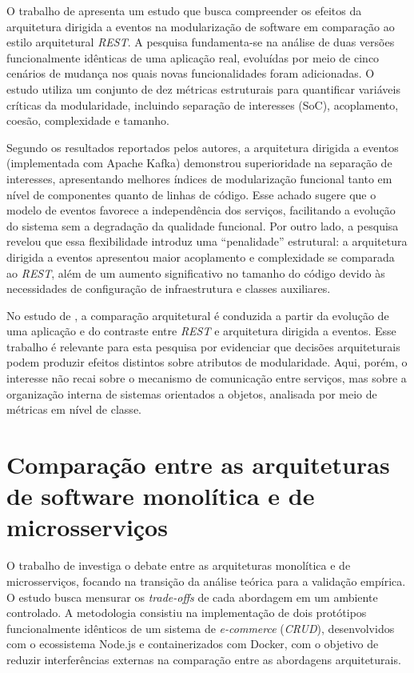 O trabalho de  apresenta um estudo que busca compreender os efeitos da arquitetura dirigida 
a eventos na modularização de software em comparação ao estilo arquitetural \textit{REST}. A pesquisa fundamenta-se na análise de duas versões 
funcionalmente idênticas de uma aplicação real, evoluídas por meio de cinco cenários de mudança nos quais novas funcionalidades foram 
adicionadas. O estudo utiliza um conjunto de dez métricas estruturais para quantificar variáveis críticas da modularidade, 
incluindo separação de interesses (SoC), acoplamento, coesão, complexidade e tamanho.

Segundo os resultados reportados pelos autores, a arquitetura dirigida a eventos (implementada com Apache Kafka) demonstrou 
superioridade na separação de interesses, apresentando melhores índices de modularização funcional tanto em nível de componentes 
quanto de linhas de código. Esse achado sugere que o modelo de eventos favorece a independência dos serviços, facilitando a evolução
do sistema sem a degradação da qualidade funcional. Por outro lado, a pesquisa revelou que essa flexibilidade introduz uma ``penalidade'' 
estrutural: a arquitetura dirigida a eventos apresentou maior acoplamento e complexidade se comparada ao \textit{REST}, além de um aumento 
significativo no tamanho do código devido às necessidades de configuração de infraestrutura e classes auxiliares.

No estudo de , a comparação arquitetural é conduzida a partir da evolução de uma aplicação e 
do contraste entre \textit{REST} e arquitetura dirigida a eventos. Esse trabalho é relevante para esta pesquisa por evidenciar 
que decisões arquiteturais podem produzir efeitos distintos sobre atributos de modularidade. Aqui, porém, o interesse 
não recai sobre o mecanismo de comunicação entre serviços, mas sobre a organização interna de sistemas orientados a 
objetos, analisada por meio de métricas em nível de classe.

\section{Comparação entre as arquiteturas de software monolítica e de microsserviços}
\label{sec:comparacao-entre-as-arquiteturas-de-software-monolitica-e-de-microsservicos}

O trabalho de  investiga o debate entre as arquiteturas monolítica e de microsserviços, focando na transição da 
análise teórica para a validação empírica. O estudo busca mensurar os \textit{trade-offs} de cada abordagem em um ambiente controlado. 
A metodologia consistiu na implementação de dois protótipos funcionalmente idênticos de um sistema de \textit{e-commerce} (\textit{CRUD}), 
desenvolvidos com o ecossistema Node.js e containerizados com Docker, com o objetivo de reduzir interferências externas na 
comparação entre as abordagens arquiteturais.


